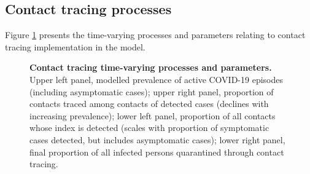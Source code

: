 

\subsection{Contact tracing processes}
Figure \ref{fig:tracing} presents the time-varying processes and parameters relating to contact tracing implementation in the model.

\begin{figure}[ht]
    \caption{\textbf{Contact tracing time-varying processes and parameters.} Upper left panel, modelled prevalence of active COVID-19 episodes (including asymptomatic cases); upper right panel, proportion of contacts traced among contacts of detected cases (declines with increasing prevalence); lower left panel, proportion of all contacts whose index is detected (scales with proportion of symptomatic cases detected, but includes asymptomatic cases); lower right panel, final proportion of all infected persons quarantined through contact tracing.}
    \label{fig:tracing}
\end{figure}
